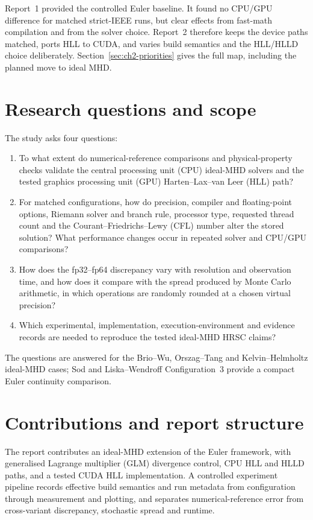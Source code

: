 Report~1 provided the controlled Euler baseline. It found no CPU/GPU difference
for matched strict-IEEE runs, but clear effects from fast-math compilation and
from the solver choice. Report~2 therefore keeps the device paths
matched, ports HLL to CUDA, and varies build semantics and the HLL/HLLD choice
deliberately. Section~\ref{sec:ch2-priorities} gives the full map, including
the planned move to ideal MHD.

\section{Research questions and scope}

The study asks four questions:

\begin{enumerate}
  \item\label{rq:mhd-validation} To what extent do numerical-reference
        comparisons and physical-property checks validate the central
        processing unit (CPU) ideal-MHD solvers and the tested graphics
        processing unit (GPU) Harten--Lax--van Leer (HLL) path?
  \item\label{rq:controlled-variation} For matched configurations, how do
        precision, compiler and floating-point options, Riemann solver and
        branch rule, processor type, requested thread count and the
        Courant--Friedrichs--Lewy (CFL) number alter the stored solution? What
        performance changes occur in repeated solver and CPU/GPU comparisons?
  \item\label{rq:scale-time-mca} How does the fp32--fp64 discrepancy vary with
        resolution and observation time, and how does it compare with the
        spread produced by Monte Carlo arithmetic, in which operations are
        randomly rounded at a chosen virtual precision?
  \item\label{rq:reproducibility-record} Which experimental, implementation,
        execution-environment and evidence records are needed to reproduce the
        tested ideal-MHD HRSC claims?
\end{enumerate}

The questions are answered for the Brio--Wu, Orszag--Tang and
Kelvin--Helmholtz ideal-MHD cases; Sod and Liska--Wendroff Configuration~3
provide a compact Euler continuity comparison.

\section{Contributions and report structure}

The report contributes an ideal-MHD extension of the Euler framework, with
generalised Lagrange multiplier (GLM) divergence control, CPU HLL and HLLD
paths, and a tested CUDA HLL implementation. A controlled experiment pipeline
records effective build semantics and run metadata from configuration through
measurement and plotting, and separates numerical-reference error from
cross-variant discrepancy, stochastic spread and runtime.
